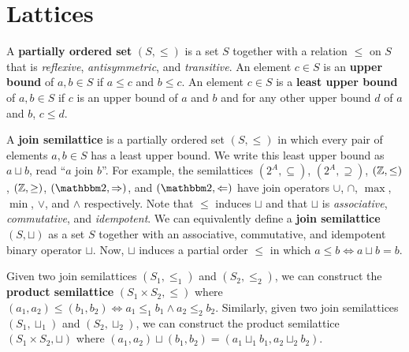 \documentclass{mwhittaker}
\title{\fluentl}
\author{\ }
\date{\ }
\newcommand{\join}{\sqcup}
\begin{document}
\maketitle

\section{Lattices}
A \textbf{partially ordered set} $(S, \leq)$ is a set $S$ together with a
relation $\leq$ on $S$ that is \textit{reflexive}, \textit{antisymmetric}, and
\textit{transitive}. An element $c \in S$ is an \textbf{upper bound} of $a, b
\in S$ if $a \leq c$ and $b \leq c$. An element $c \in S$ is a \textbf{least
upper bound} of $a, b \in S$ if $c$ is an upper bound of $a$ and $b$ and for
any other upper bound $d$ of $a$ and $b$, $c \leq d$.

A \textbf{join semilattice} is a partially ordered set $(S, \leq)$ in which
every pair of elements $a, b \in S$ has a least upper bound. We write this
least upper bound as $a \join b$, read ``$a$ join $b$''. For example, the
semilattices $(2^A, \subseteq)$, $(2^A, \supseteq)$, $(\mathbb{Z}, \leq)$, $(\mathbb{Z},
\geq)$, $(\bools, \Rightarrow)$, and $(\bools, \Leftarrow)$ have join operators
$\cup$, $\cap$, $\max$, $\min$, $\lor$, and $\land$ respectively. Note that
$\leq$ induces $\join$ and that $\join$ is \textit{associative},
\textit{commutative}, and \textit{idempotent}.
%
We can equivalently define a \textbf{join semilattice} $(S, \join)$ as a set
$S$ together with an associative, commutative, and idempotent binary operator
$\join$. Now, $\join$ induces a partial order $\leq$ in which $a \leq b \iff a
\join b = b$.

Given two join semilattices $(S_1, \leq_1)$ and $(S_2, \leq_2)$, we can
construct the \textbf{product semilattice} $(S_1 \times S_2, \leq)$ where
$(a_1, a_2) \leq (b_1, b_2) \iff a_1 \leq_1 b_1 \land a_2 \leq_2 b_2$.
Similarly, given two join semilattices $(S_1, \join_1)$ and $(S_2, \join_2)$,
we can construct the product semilattice $(S_1 \times S_2, \join)$ where $(a_1,
a_2) \join (b_1, b_2) = (a_1 \join_1 b_1, a_2 \join_2 b_2)$.
\end{document}
